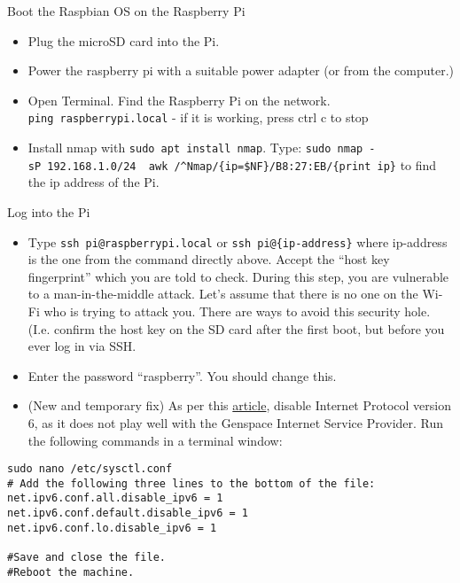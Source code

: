 \documentclass[]{book}
\begin{document}
Boot the Raspbian OS on the Raspberry Pi

\begin{itemize}
\item
  Plug the microSD card into the Pi.
\item
  Power the raspberry pi with a suitable power adapter (or from the computer.)
\item
  Open Terminal. Find the Raspberry Pi on the network. \texttt{ping\ raspberrypi.local} - if it is working, press ctrl c to stop
\item
  Install nmap with \texttt{sudo\ apt\ install\ nmap}. Type: \texttt{sudo\ nmap\ -sP\ 192.168.1.0/24\ \textbar{}\ awk\ \textquotesingle{}/\^{}Nmap/\{ip=\$NF\}/B8:27:EB/\{print\ ip\}\textquotesingle{}} to find the ip address of the Pi.
\end{itemize}

Log into the Pi

\begin{itemize}
\item
  Type \texttt{ssh\ pi@raspberrypi.local} or \texttt{ssh\ pi@\{ip-address\}} where ip-address is the one from the command directly above. Accept the ``host key fingerprint'' which you are told to check. During this step, you are vulnerable to a man-in-the-middle attack. Let's assume that there is no one on the Wi-Fi who is trying to attack you. There are ways to avoid this security hole. (I.e. confirm the host key on the SD card after the first boot, but before you ever log in via SSH.
\item
  Enter the password ``raspberry''. You should change this.
\item
  (New and temporary fix) As per this \href{https://www.techrepublic.com/article/how-to-disable-ipv6-on-linux/}{article}, disable Internet Protocol version 6, as it does not play well with the Genspace Internet Service Provider. Run the following commands in a terminal window:
\end{itemize}

\begin{verbatim}
sudo nano /etc/sysctl.conf
# Add the following three lines to the bottom of the file:
net.ipv6.conf.all.disable_ipv6 = 1
net.ipv6.conf.default.disable_ipv6 = 1
net.ipv6.conf.lo.disable_ipv6 = 1

#Save and close the file.
#Reboot the machine.
\end{verbatim}
\end{document}

